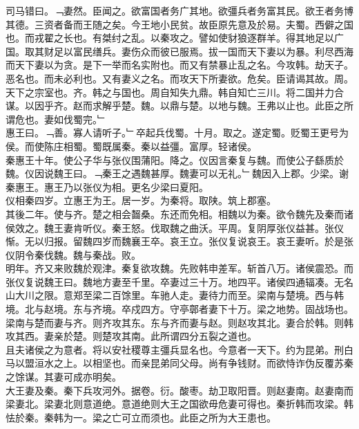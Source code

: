 \documentclass{zhvt-classic}
\begin{document}
\hspace*{2em}司马错曰。﹁妻然。臣闻之。欲富国者务广其地。欲彊兵者务富其民。欲王者务博其德。三资者备而王随之矣。今王地小民贫。故臣原先意及於易。夫蜀。西僻之国也。而戎翟之长也。有桀纣之乱。以秦攻之。譬如使豺狼逐群羊。得其地足以广国。取其财足以富民缮兵。妻伤众而彼已服焉。拔一国而天下妻以为暴。利尽西海而天下妻以为贪。是下一举而名实附也。而又有禁暴止乱之名。今攻韩。劫天子。恶名也。而未必利也。又有妻义之名。而攻天下所妻欲。危矣。臣请谒其故。周。天下之宗室也。齐。韩之与国也。周自知失九鼎。韩自知亡三川。将二国并力合谋。以因乎齐。赵而求解乎楚。魏。以鼎与楚。以地与魏。王弗以止也。此臣之所谓危也。妻如伐蜀完。﹂\\
\hspace*{2em}惠王曰。﹁善。寡人请听子。﹂卒起兵伐蜀。十月。取之。遂定蜀。贬蜀王更号为侯。而使陈庄相蜀。蜀既属秦。秦以益彊。富厚。轻诸侯。\\
\hspace*{2em}秦惠王十年。使公子华与张仪围蒲阳。降之。仪因言秦复与魏。而使公子繇质於魏。仪因说魏王曰。﹁秦王之遇魏甚厚。魏妻可以无礼。﹂魏因入上郡。少梁。谢秦惠王。惠王乃以张仪为相。更名少梁曰夏阳。\\
\hspace*{2em}仪相秦四岁。立惠王为王。居一岁。为秦将。取陕。筑上郡塞。\\
\hspace*{2em}其後二年。使与齐。楚之相会齧桑。东还而免相。相魏以为秦。欲令魏先及秦而诸侯效之。魏王妻肯听仪。秦王怒。伐取魏之曲沃。平周。复阴厚张仪益甚。张仪惭。无以归报。留魏四岁而魏襄王卒。哀王立。张仪复说哀王。哀王妻听。於是张仪阴令秦伐魏。魏与秦战。败。\\
\hspace*{2em}明年。齐又来败魏於观津。秦复欲攻魏。先败韩申差军。斩首八万。诸侯震恐。而张仪复说魏王曰。魏地方妻至千里。卒妻过三十万。地四平。诸侯四通辐凑。无名山大川之限。意郑至梁二百馀里。车驰人走。妻待力而至。梁南与楚境。西与韩境。北与赵境。东与齐境。卒戍四方。守亭鄣者妻下十万。梁之地势。固战场也。梁南与楚而妻与齐。则齐攻其东。东与齐而妻与赵。则赵攻其北。妻合於韩。则韩攻其西。妻亲於楚。则楚攻其南。此所谓四分五裂之道也。\\
\hspace*{2em}且夫诸侯之为意者。将以安社稷尊主彊兵显名也。今意者一天下。约为昆弟。刑白马以盟洹水之上。以相坚也。而亲昆弟同父母。尚有争钱财。而欲恃诈伪反覆苏秦之馀谋。其妻可成亦明矣。\\
\hspace*{2em}大王妻及秦。秦下兵攻河外。据卷。衍。酸枣。劫卫取阳晋。则赵妻南。赵妻南而梁妻北。梁妻北则意道绝。意道绝则大王之国欲毋危妻可得也。秦折韩而攻梁。韩怯於秦。秦韩为一。梁之亡可立而须也。此臣之所为大王患也。\\
\end{document}
